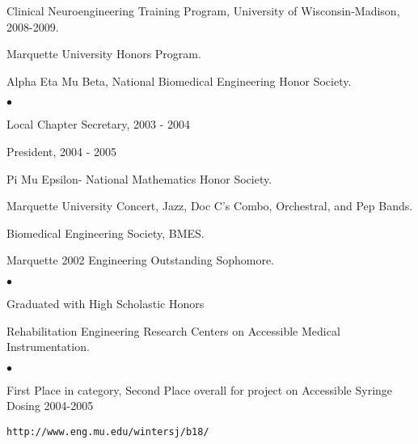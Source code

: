 \documentclass[margin,line]{res}
\newenvironment{list2}{
  \begin{list}{$\bullet$}{%
      \setlength{\itemsep}{0in}
      \setlength{\parsep}{0in} \setlength{\parskip}{0in}
      \setlength{\topsep}{0in} \setlength{\partopsep}{0in} 
      \setlength{\leftmargin}{0.2in}}}{\end{list}}
\begin{document}
\begin{resume}
Clinical Neuroengineering Training Program, University of Wisconsin-Madison,
2008-2009.

Marquette University Honors Program.

Alpha Eta Mu Beta, National Biomedical Engineering Honor Society.
\begin{list2}
 \item Local Chapter Secretary, 2003 - 2004
 \item President, 2004 - 2005
\end{list2}

Pi Mu Epsilon- National Mathematics Honor Society.

Marquette University Concert, Jazz, Doc C's Combo, Orchestral, and Pep Bands.

Biomedical Engineering Society, BMES.

Marquette 2002 Engineering Outstanding Sophomore.
\begin{list2}
\item Graduated with High Scholastic Honors
\end{list2}

Rehabilitation Engineering Research Centers on Accessible Medical
Instrumentation.
\begin{list2}
 \item First Place in category, Second Place overall for project on Accessible Syringe Dosing 2004-2005
 \item \begin{verbatim}http://www.eng.mu.edu/wintersj/b18/\end{verbatim}
\end{list2}
%





\end{resume}
\end{document}
